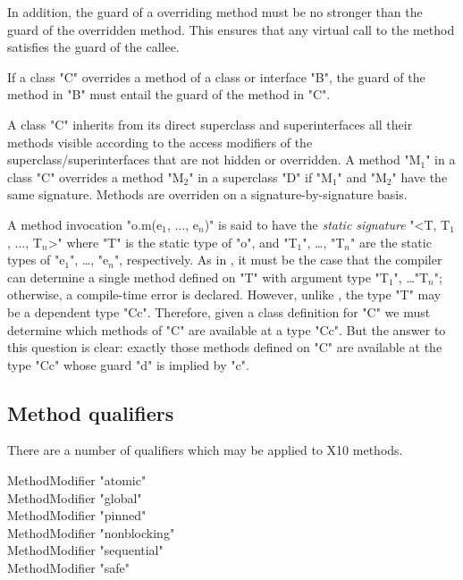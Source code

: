 In addition, the guard of a overriding method must be 
no stronger than the guard of the overridden method.   This
ensures that any virtual call to the method
satisfies the guard of the callee.

\begin{staticrule*}
  If a class \xcd"C" overrides a method of a class or interface
  \xcd"B", the guard of the method in \xcd"B" must entail
  the guard of the method in \xcd"C".
\end{staticrule*}

A class \xcd"C" inherits from its direct superclass and superinterfaces all
their methods visible according to the access modifiers
of the superclass/superinterfaces that are not hidden or overridden. A method \xcdmath"M$_1$" in a class
\xcd"C" overrides
a method \xcdmath"M$_2$" in a superclass \xcd"D" if
\xcdmath"M$_1$" and \xcdmath"M$_2$" have the same signature.
Methods are overriden on a signature-by-signature basis.

A method invocation \xcdmath"o.m(e$_1$, $\dots$, e$_n$)"
is said to have the {\em static signature}
\xcdmath"<T, T$_1$, $\dots$, T$_n$>" where \xcd"T" is the static type of
\xcd"o", and
\xcdmath"T$_1$",
\dots,
\xcdmath"T$_n$"
are the static types of \xcdmath"e$_1$", \dots, \xcdmath"e$_n$",
respectively.  As in
\Java, it must be the case that the compiler can determine a single
method defined on \xcd"T" with argument type
\xcdmath"T$_1$", \dots \xcdmath"T$_n$"; otherwise, a
compile-time error is declared. However, unlike \Java, the \Xten{} type \xcd"T"
may be a dependent type \xcd"C{c}". Therefore, given a class definition for
\xcd"C" we must determine which methods of \xcd"C" are available at a type
\xcd"C{c}". But the answer to this question is clear: exactly those methods
defined on \xcd"C" are available at the type \xcd"C{c}"
whose guard \xcd"d" is implied by \xcd"c".

\subsection{Method qualifiers}
\label{MethodQualifier}

There are a number of qualifiers which may be applied to X10 methods.

\begin{grammar}
  MethodModifier \: \xcd"atomic"  \\
  MethodModifier \: \xcd"global"  \\
  MethodModifier \: \xcd"pinned"  \\
  MethodModifier \: \xcd"nonblocking"  \\
  MethodModifier \: \xcd"sequential"  \\
  MethodModifier \: \xcd"safe"  
\end{grammar}


